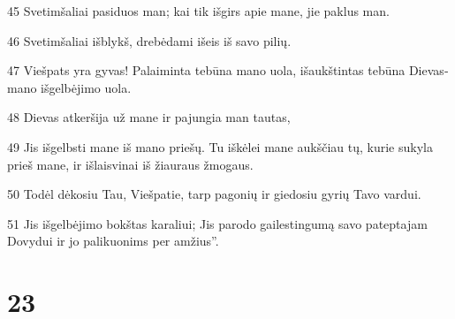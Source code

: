 \par 45 Svetimšaliai pasiduos man; kai tik išgirs apie mane, jie paklus man. 
\par 46 Svetimšaliai išblykš, drebėdami išeis iš savo pilių. 
\par 47 Viešpats yra gyvas! Palaiminta tebūna mano uola, išaukštintas tebūna Dievas­mano išgelbėjimo uola. 
\par 48 Dievas atkeršija už mane ir pajungia man tautas, 
\par 49 Jis išgelbsti mane iš mano priešų. Tu iškėlei mane aukščiau tų, kurie sukyla prieš mane, ir išlaisvinai iš žiauraus žmogaus. 
\par 50 Todėl dėkosiu Tau, Viešpatie, tarp pagonių ir giedosiu gyrių Tavo vardui. 
\par 51 Jis išgelbėjimo bokštas karaliui; Jis parodo gailestingumą savo pateptajam Dovydui ir jo palikuonims per amžius”.



\chapter{23}


